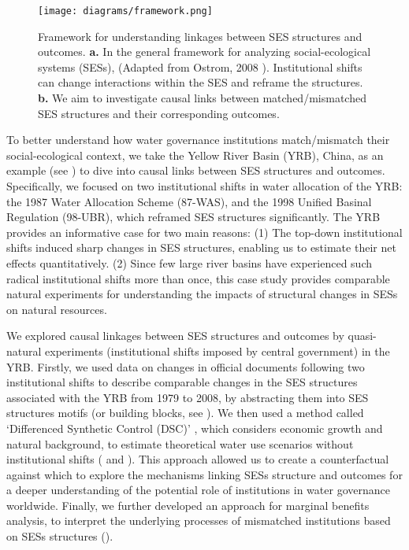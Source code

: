 \begin{figure}[!h]
	\centering
	\texttt{[image: diagrams/framework.png]}
	\caption{
		Framework for understanding linkages between SES structures and outcomes. \textbf{a.} In the general framework for analyzing social-ecological systems (SESs), (Adapted from Ostrom, 2008 \cite{ostrom2009}). Institutional shifts can change interactions within the SES and reframe the structures.  \textbf{b.} We aim to investigate causal links between matched/mismatched SES structures and their corresponding outcomes.
	}
	\label{fig:framework}
\end{figure}

To better understand how water governance institutions match/mismatch their social-ecological context, we take the Yellow River Basin (YRB), China, as an example (see \textit{}) to dive into causal links between SES structures and outcomes.
Specifically, we focused on two institutional shifts in water allocation of the YRB: the 1987 Water Allocation Scheme (87-WAS), and the 1998 Unified Basinal Regulation (98-UBR), which reframed SES structures significantly.
The YRB provides an informative case for two main reasons:
(1) The top-down institutional shifts induced sharp changes in SES structures, enabling us to estimate their net effects quantitatively.
(2) Since few large river basins have experienced such radical institutional shifts more than once, this case study provides comparable natural experiments for understanding the impacts of structural changes in SESs on natural resources.

We explored causal linkages between SES structures and outcomes by quasi-natural experiments (institutional shifts imposed by central government) in the YRB.
Firstly, we used data on changes in official documents following two institutional shifts to describe comparable changes in the SES structures associated with the YRB from 1979 to 2008, by abstracting them into SES structures motifs (or building blocks, see \textit{}).
We then used a method called `Differenced Synthetic Control (DSC)' \cite{arkhangelsky2021}, which considers economic growth and natural background, to estimate theoretical water use scenarios without institutional shifts (\textit{} and \textit{}).
This approach allowed us to create a counterfactual against which to explore the mechanisms linking SESs structure and outcomes for a deeper understanding of the potential role of institutions in water governance worldwide.
Finally, we further developed an approach for marginal benefits analysis, to interpret the underlying processes of mismatched institutions based on SESs structures (\textit{}).
